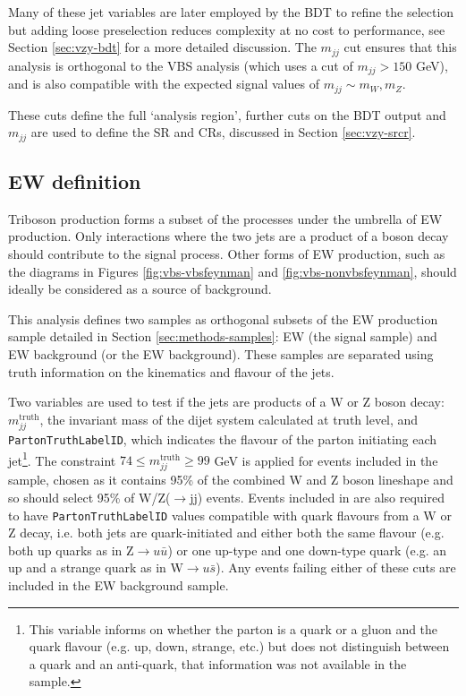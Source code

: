 Many of these jet variables are later employed by the \ac{BDT} to refine
the selection but adding loose preselection reduces complexity at no cost to
performance, see Section \ref{sec:vzy-bdt} for a more detailed discussion.
The $m_{jj}$ cut ensures that this analysis is orthogonal to the \ac{VBS} \Zy
analysis (which uses a cut of $m_{jj} > 150$ GeV), and is also compatible with
the expected signal values of $m_{jj} \sim m_W,m_Z$.

These cuts define the full `analysis region', further cuts on the \ac{BDT} output
and $m_{jj}$ are used to define the \ac{SR} and \acp{CR}, discussed in Section
\ref{sec:vzy-srcr}.


\subsection{\acs{EW} \VZy definition}
\label{sec:vzy-selection-vzy}

Triboson \VZy production forms a subset of the processes under the umbrella of
\ac{EW} \Zyjj production. Only interactions where the two jets are a product of
a boson decay should contribute to the signal process. Other forms of \ac{EW}
\Zyjj production, such as the diagrams in Figures \ref{fig:vbs-vbsfeynman} and
\ref{fig:vbs-nonvbsfeynman}, should ideally be considered as a source of
background.

\newcommand\mjjtruth{\ensuremath{m_{jj}^\text{truth}}\xspace}
\newcommand\partonid{\texttt{PartonTruthLabelID}\xspace}
This analysis defines two samples as orthogonal subsets of the \ac{EW} \Zyjj
production sample detailed in Section \ref{sec:methods-samples}: \ac{EW} \VZy
(the signal sample) and \ac{EW} \Zyjj background (or the \ac{EW}
background). These samples are separated using truth information on the
kinematics and flavour of the jets.

Two variables are used to test if the jets are products of a W or Z boson decay:
\mjjtruth, the invariant mass of the dijet system calculated at truth level, and
\partonid, which indicates the flavour of the parton initiating each
jet\footnote{
  This variable informs on whether the parton is a quark or a gluon and the
  quark flavour (e.g. up, down, strange, etc.) but does not distinguish between
  a quark and an anti-quark, that information was not available in the sample.
}.
The constraint $74 \leq \mjjtruth \geq 99$ GeV is applied for events included in
the \VZy sample, chosen as it contains 95\% of the combined W and Z boson
lineshape and so should select 95\% of W/Z($\to$jj) events. Events included in
\VZy are also required to have {\partonid} values compatible with quark flavours
from a W or Z decay, i.e. both jets are quark-initiated and either both the same
flavour (e.g. both up quarks as in Z$\to u\bar{u}$) or one up-type and one
down-type quark (e.g. an up and a strange quark as in W$\to u\bar{s}$). Any
events failing either of these cuts are included in the \ac{EW} background
sample.

